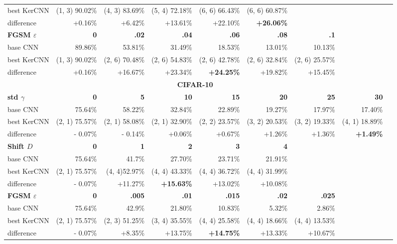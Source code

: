 \documentclass[11pt,oneside,reqno]{amsart}
\begin{document}
{\begin{table}[htbp!]
\begin{tabular}{@{}lrrrrrrrr@{}}
      best KerCNN & (1, 3) 90.02\% & (4, 3) 83.69\% & (5, 4) 72.18\% & (6, 6) 66.43\% & (6, 6) 60.87\% &  & \\
    difference & +0.16\% & +6.42\% & +13.61\% & +22.10\% & \textbf{+26.06\%} & & \vspace{5pt}\\
  \textbf{FGSM $\varepsilon$} & \textbf{0} & \textbf{.02} & \textbf{.04} & \textbf{.06} & \textbf{.08} & \textbf{.1} & \\
   base CNN    & 89.86\% & 53.81\% & 31.49\% & 18.53\% & 13.01\% & 10.13\% &  \\ 
      best KerCNN & (1, 3) 90.02\% & (2, 6) 70.48\% & (2, 6) 54.83\% & (2, 6) 42.78\% & (2, 6) 32.84\% & (2, 6) 25.57\% &  \\
    difference & +0.16\% & +16.67\% & +23.34\% & \textbf{+24.25\%} & +19.82\% & +15.45\% & \\
      \midrule
      \multicolumn{8}{c}{\textbf{CIFAR-10}}\vspace{5pt}\\
     \textbf{std $\gamma$} & \textbf{0} & \textbf{5} & \textbf{10} & \textbf{15} & \textbf{20} & \textbf{25} & \textbf{30} \\
      base CNN  & 75.64\% & 58.22\% & 32.84\% & 22.89\% & 19.27\% & 17.97\% & 17.40\% \\ 
      best KerCNN  & (2, 1) 75.57\% & (2, 1) 58.08\% & (2, 1) 32.90\% & (2, 2) 23.57\% & (3, 2) 20.53\% & (3, 2) 19.33\% & (4, 1) 18.89\% \\
      difference & - 0.07\% & - 0.14\% & +0.06\% & +0.67\% & +1.26\% & +1.36\% & \textbf{+1.49\%} \vspace{5pt}\\ 
    \textbf{Shift $D$} & \textbf{0} & \textbf{1} & \textbf{2} & \textbf{3} & \textbf{4} & & \\
     base CNN     & 75.64\% & 41.7\% & 27.70\% & 23.71\% & 21.91\% & & \\ 
      best KerCNN  & (2, 1) 75.57\% & (4, 4)52.97\% & (4, 4) 43.33\% & (4, 4) 36.72\% & (4, 4) 31.99\% & & \\
    difference & - 0.07\% & +11.27\% & \textbf{+15.63\%} & +13.02\% & +10.08\% & & \vspace{5pt}\\
   \textbf{FGSM $\varepsilon$} & \textbf{0} & \textbf{.005} & \textbf{.01} & \textbf{.015} & \textbf{.02} & \textbf{.025} & \\
    base CNN    & 75.64\% & 42.9\% & 21.80\% & 10.83\% & 5.32\% & 2.86\% & \\ 
      best KerCNN  & (2, 1) 75.57\% & (2, 3) 51.25\% & (3, 4) 35.55\% & (4, 4) 25.58\% & (4, 4) 18.66\% & (4, 4) 13.53\% & \\
    difference & - 0.07\% & +8.35\% & +13.75\% & \textbf{+14.75\%} & +13.33\% & +10.67\% & \\
    \bottomrule
     \end{tabular}
\end{table}
}
\end{document}
